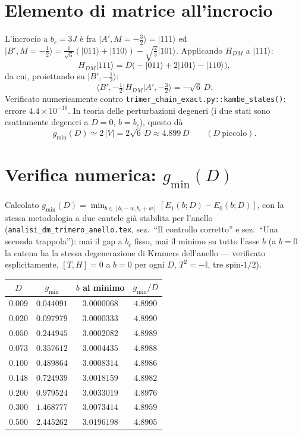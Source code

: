 \documentclass[11pt,a4paper]{article}
\newcommand{\ket}[1]{\lvert #1\rangle}
\begin{document}
\section{Elemento di matrice all'incrocio}

L'incrocio a $b_c=3J$ è fra $\ket{A',M{=}-\tfrac32}=\ket{111}$ ed
$\ket{B',M{=}-\tfrac12}=\tfrac{1}{\sqrt6}(\ket{011}+\ket{110})-\sqrt{\tfrac23}\ket{101}$.
Applicando $H_{DM}$ a $\ket{111}$:
\[
H_{DM}\ket{111} = D\big({-}\ket{011}+2\ket{101}-\ket{110}\big),
\]
da cui, proiettando su $\ket{B',-\tfrac12}$:
\[
\big\langle B',{-}\tfrac12\big|H_{DM}\big|A',{-}\tfrac32\big\rangle = -\sqrt6\,D.
\]
Verificato numericamente contro \texttt{trimer\_chain\_exact.py::kambe\_states()}:
errore $4.4\times10^{-16}$. In teoria delle perturbazioni degeneri (i due stati sono
esattamente degeneri a $D=0$, $b=b_c$), questo dà
\[
g_\text{min}(D) \simeq 2\,|V| = 2\sqrt6\,D \approx 4.899\,D \qquad (D\ \text{piccolo}).
\]

\section{Verifica numerica: \texorpdfstring{$g_\text{min}(D)$}{g\_min(D)}}
\label{sec:gmin-tabella}

Calcolato $g_\text{min}(D)=\min_{b\in[b_c-w,b_c+w]}[E_1(b;D)-E_0(b;D)]$, con la
stessa metodologia a due cautele già stabilita per l'anello
(\texttt{analisi\_dm\_trimero\_anello.tex}, sez.\ ``Il controllo corretto'' e sez.\
``Una seconda trappola''): mai il gap a $b_c$ fisso, mai il minimo su tutto l'asse
$b$ (a $b=0$ la catena ha la stessa degenerazione di Kramers dell'anello — verificato
esplicitamente, $[T,H]=0$ a $b=0$ per ogni $D$, $T^2=-\mathbb I$, tre spin-$1/2$).

\begin{center}
\renewcommand{\arraystretch}{1.3}
\begin{tabular}{cccc}
\toprule
$D$ & $g_\text{min}$ & $b$ al minimo & $g_\text{min}/D$ \\
\midrule
$0.009$ & $0.044091$ & $3.0000068$ & $4.8990$ \\
$0.020$ & $0.097979$ & $3.0000333$ & $4.8990$ \\
$0.050$ & $0.244945$ & $3.0002082$ & $4.8989$ \\
$0.073$ & $0.357612$ & $3.0004435$ & $4.8988$ \\
$0.100$ & $0.489864$ & $3.0008314$ & $4.8986$ \\
$0.148$ & $0.724939$ & $3.0018159$ & $4.8982$ \\
$0.200$ & $0.979524$ & $3.0033019$ & $4.8976$ \\
$0.300$ & $1.468777$ & $3.0073414$ & $4.8959$ \\
$0.500$ & $2.445262$ & $3.0196198$ & $4.8905$ \\
\bottomrule
\end{tabular}
\end{center}
\end{document}
